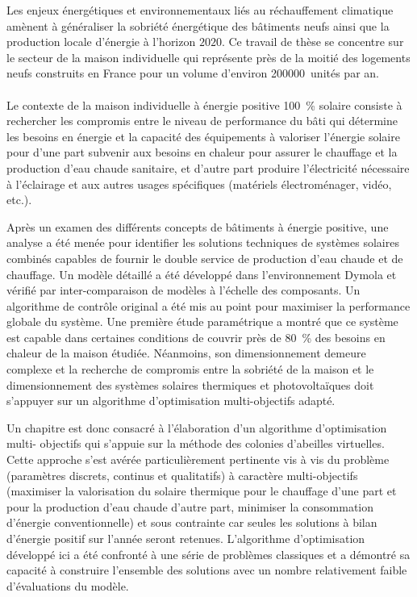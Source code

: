 

Les enjeux énergétiques et environnementaux liés au réchauffement climatique amènent à
généraliser la sobriété énergétique des bâtiments neufs ainsi que la production locale
d’énergie à l’horizon $2020$. Ce travail de thèse se concentre sur le secteur de la maison
individuelle qui représente près de la moitié des logements neufs construits en France
pour un volume d’environ \si{200000}~unités par an.

\paragraph{} %
Le contexte de la maison individuelle à énergie positive \SI{100}{\percent} solaire consiste à
rechercher les compromis entre le niveau de performance du bâti qui détermine les besoins
en énergie et la capacité des équipements à valoriser l’énergie solaire pour d’une part
subvenir aux besoins en chaleur pour assurer le chauffage et la production d’eau chaude
sanitaire, et d’autre part produire l’électricité nécessaire à l’éclairage et aux autres
usages spécifiques (matériels électroménager, vidéo, etc.).

Après un examen des différents concepts de bâtiments à énergie positive, une analyse a été
menée pour identifier les solutions techniques de systèmes solaires combinés capables de
fournir le double service de production d’eau chaude et de chauffage. Un modèle détaillé a
été développé dans l’environnement Dymola et vérifié par inter-comparaison de modèles à
l’échelle des composants. Un algorithme de contrôle original a été mis au point pour
maximiser la performance globale du système. Une première étude paramétrique a montré que
ce système est capable dans certaines conditions de couvrir près de \SI{80}{\percent} des besoins en
chaleur de la maison étudiée. Néanmoins, son dimensionnement demeure complexe et la
recherche de compromis entre la sobriété de la maison et le dimensionnement des systèmes
solaires thermiques et photovoltaïques doit s’appuyer sur un algorithme d’optimisation
multi-objectifs adapté.

Un chapitre est donc consacré à l’élaboration d’un algorithme d’optimisation multi-
objectifs qui s’appuie sur la méthode des colonies d’abeilles virtuelles. Cette approche
s’est avérée particulièrement pertinente vis à vis du problème (paramètres discrets,
continus et qualitatifs) à caractère multi-objectifs (maximiser la valorisation du solaire
thermique pour le chauffage d’une part et pour la production d’eau chaude d’autre part,
minimiser la consommation d’énergie conventionnelle) et sous contrainte car seules les
solutions à bilan d’énergie positif sur l’année seront retenues. L’algorithme
d’optimisation développé ici a été confronté à une série de problèmes classiques et a
démontré sa capacité à construire l’ensemble des solutions avec un nombre relativement
faible d’évaluations du modèle.

